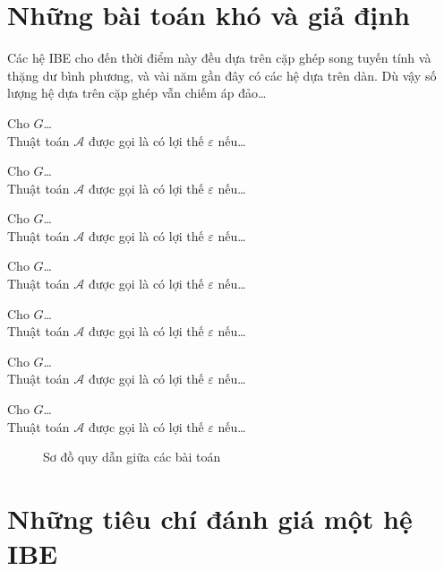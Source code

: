 \documentclass[class=report, crop=false]{standalone}
\begin{document}
	\section{Những bài toán khó và giả định}
		Các hệ IBE cho đến thời điểm này đều dựa trên cặp ghép song tuyến tính và thặng dư bình phương, và vài năm gần đây có các hệ dựa trên dàn. Dù vậy số lượng hệ dựa trên cặp ghép vẫn chiếm áp đảo\dots
		\begin{dl}
			Cho $G$\dots\\
			Thuật toán $\mathcal{A}$ được gọi là có lợi thế $\varepsilon$ nếu\dots

		\end{dl}
		\begin{cdh}
			Cho $G$\dots\\
			Thuật toán $\mathcal{A}$ được gọi là có lợi thế $\varepsilon$ nếu\dots

		\end{cdh}
		\begin{ddh}
			Cho $G$\dots\\
			Thuật toán $\mathcal{A}$ được gọi là có lợi thế $\varepsilon$ nếu\dots

		\end{ddh}
		\begin{cbdh}
			Cho $G$\dots\\
			Thuật toán $\mathcal{A}$ được gọi là có lợi thế $\varepsilon$ nếu\dots

		\end{cbdh}
		\begin{dbdh}
			Cho $G$\dots\\
			Thuật toán $\mathcal{A}$ được gọi là có lợi thế $\varepsilon$ nếu\dots

		\end{dbdh}
		\begin{cbdhe}
			Cho $G$\dots\\
			Thuật toán $\mathcal{A}$ được gọi là có lợi thế $\varepsilon$ nếu\dots

		\end{cbdhe}
		\begin{dbdhe}
			Cho $G$\dots\\
			Thuật toán $\mathcal{A}$ được gọi là có lợi thế $\varepsilon$ nếu\dots

		\end{dbdhe}
		\begin{figure}
			\caption{Sơ đồ quy dẫn giữa các bài toán}
		\end{figure}
	\section{Những tiêu chí đánh giá một hệ IBE}
\end{document}
